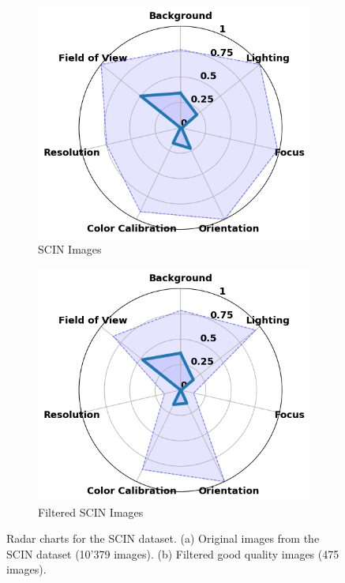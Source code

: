 \begin{figure}[ht]
    \centering
    \begin{subfigure}[b]{0.48\textwidth}
        \includegraphics[width=\textwidth]{img/hept/SCIN10k.png}
        \caption{SCIN Images}
        \label{fig:SCIN10k}
    \end{subfigure}
    \hfill
    \begin{subfigure}[b]{0.48\textwidth}
        \includegraphics[width=\textwidth]{img/hept/SCIN.png}
        \caption{Filtered SCIN Images}
        \label{fig:SCIN}
    \end{subfigure}
    \hfill
    \caption{Radar charts for the SCIN dataset. (a) Original images from the SCIN dataset (10'379 images). (b) Filtered good quality images (475 images).}
    \label{fig:SF}
\end{figure}
